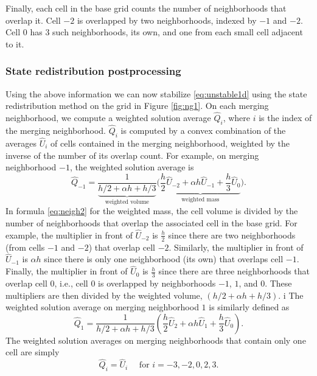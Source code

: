 Finally, each cell in the base grid counts the number of neighborhoods that overlap it. 
Cell $-2$ is overlapped by two neighborhoods, indexed by $-1$ and $-2$.
Cell 0 has 3 such neighborhoods, its own, and one from each small cell adjacent to it.

\subsubsection*{State redistribution postprocessing}
Using the above information we can now stabilize \eqref{eq:unstable1d} using the state redistribution 
method on the grid in Figure \ref{fig:ng1}.  
On each merging neighborhood, we compute a weighted solution average $\widehat Q_i$, where $i$ is the 
index of the merging neighborhood. 
$\widehat Q_i$ is computed by a convex combination of the averages $\widehat{U}_i$ of cells contained in the 
merging neighborhood, weighted by the inverse of the number of its overlap count. 
For example, on merging neighborhood $-1$, the weighted solution average is
\begin{equation}\label{eq:neigh2}
\widehat{Q}_{-1} = \frac{1}{\underbrace{h/2 + \alpha h + h/3}_{\text{weighted volume}}}\biggr( \underbrace{\frac{h}{2} \widehat{U}_{-2} + \alpha h \widehat{U}_{-1} + \frac{h}{3}\widehat{U}_{0}}_{\text{weighted mass}} \biggr).
\end{equation}
In formula \eqref{eq:neigh2}  for the weighted mass,
the cell volume is divided by the number of neighborhoods that overlap the associated cell 
in the base grid. 
For example, the multiplier in front of $\widehat{U}_{-2}$ is $\frac{h}{2}$ since there are 
two neighborhoods (from cells $-1$ and $-2$) that overlap cell $-2$.  
Similarly, the multiplier in front of $\widehat{U}_{-1}$ is $\alpha h$ since there is only 
one neighborhood (its own) that overlaps cell $-1$.
Finally, the multiplier in front of $\widehat{U}_{0}$ is $\frac{h}{3}$ since there are three neighborhoods that overlap cell $0$, i.e., cell $0$ is overlapped by neighborhoods $-1$, $1$, and $0$.
These multipliers are then divided by the weighted volume,  $(h/2 + \alpha h + h/3)$.
i%
The weighted solution average on merging neighborhood $1$ is similarly defined as
\begin{equation}\label{eq:neigh3}
\widehat{Q}_{1} = \frac{1}{h/2 + \alpha h + h/3}\left( \frac{h}{2} \widehat{U}_{2} + \alpha h \widehat{U}_{1} + \frac{h}{3}\widehat{U}_{0} \right).
\end{equation}
The weighted solution averages on merging neighborhoods that contain only one cell are simply 
\begin{equation}\label{eq:neigh1}
\widehat{Q}_i = \widehat{U}_i \quad \text{ for } i = -3,-2,0,2,3.
\end{equation}

